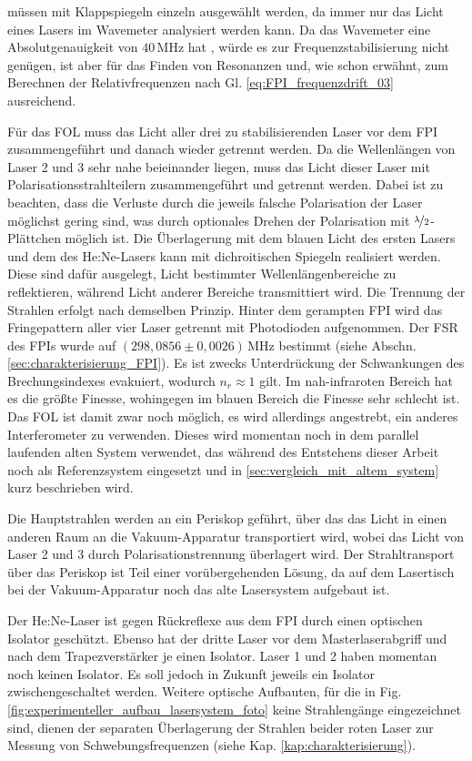 müssen mit Klappspiegeln einzeln ausgewählt werden, da immer nur das Licht eines Lasers im Wavemeter analysiert werden kann. Da das Wavemeter eine
Absolutgenauigkeit von $40\,$MHz hat
\cite{wavemeter_hardware_guide}, würde es zur Frequenzstabilisierung nicht
genügen, ist aber für das Finden von Resonanzen und, wie schon erwähnt, zum
Berechnen der Relativfrequenzen nach Gl. \eqref{eq:FPI_frequenzdrift_03} ausreichend.\par Für das FOL muss das Licht aller drei zu stabilisierenden
Laser vor dem FPI zusammengeführt und danach wieder getrennt werden. Da die
Wellenlängen von Laser 2 und 3 sehr nahe beieinander liegen, muss das Licht
dieser Laser mit Polarisationsstrahlteilern zusammengeführt und getrennt werden.
Dabei ist zu beachten, dass die Verluste durch die jeweils falsche Polarisation
der Laser möglichst gering sind, was durch optionales Drehen der
Polarisation mit $\nicefrac{\lambda}{2}$-Plättchen möglich ist. Die Überlagerung
mit dem blauen Licht des ersten Lasers und dem des He:Ne-Lasers kann mit
dichroitischen Spiegeln realisiert werden. Diese sind dafür ausgelegt, Licht
bestimmter Wellenlängenbereiche zu reflektieren, während Licht anderer  Bereiche
transmittiert wird. Die Trennung der Strahlen erfolgt nach demselben Prinzip.
Hinter dem gerampten FPI wird das Fringepattern aller vier Laser getrennt mit
Photodioden aufgenommen. Der FSR des FPIs wurde auf $(298,0856\pm0,0026)\,$MHz
bestimmt (siehe Abschn. \ref{sec:charakterisierung_FPI}).
Es ist zwecks Unterdrückung der Schwankungen des Brechungsindexes evakuiert,
wodurch $n_r\approx1$ gilt. Im nah-infraroten Bereich hat es die größte Finesse, wohingegen im blauen Bereich
die Finesse sehr schlecht ist. Das FOL ist damit zwar noch
möglich, es wird allerdings angestrebt, ein anderes Interferometer zu verwenden.
Dieses wird momentan noch in dem parallel laufenden alten System verwendet, das
während des Entstehens dieser Arbeit noch als Referenzsystem eingesetzt und in
\ref{sec:vergleich_mit_altem_system} kurz beschrieben wird.\par
Die Hauptstrahlen werden an ein Periskop geführt, über das das Licht in einen
anderen Raum an die Vakuum-Apparatur transportiert wird, wobei das Licht von
Laser 2 und 3 durch Polarisationstrennung überlagert wird. Der
Strahltransport über das Periskop ist Teil einer vorübergehenden Lösung, da auf
dem Lasertisch bei der Vakuum-Apparatur noch das alte Lasersystem aufgebaut
ist.\par Der He:Ne-Laser ist gegen Rückreflexe aus dem FPI durch einen optischen Isolator
geschützt. Ebenso hat der dritte Laser vor dem Masterlaserabgriff und nach dem
Trapezverstärker je einen Isolator. Laser 1 und 2 haben momentan noch keinen
Isolator. Es soll jedoch in Zukunft jeweils ein Isolator zwischengeschaltet
werden. Weitere optische Aufbauten, für die in Fig.
\ref{fig:experimenteller_aufbau_lasersystem_foto} keine Strahlengänge eingezeichnet
sind, dienen der separaten Überlagerung der Strahlen beider roten Laser zur
Messung von Schwebungsfrequenzen (siehe Kap. \ref{kap:charakterisierung}).

